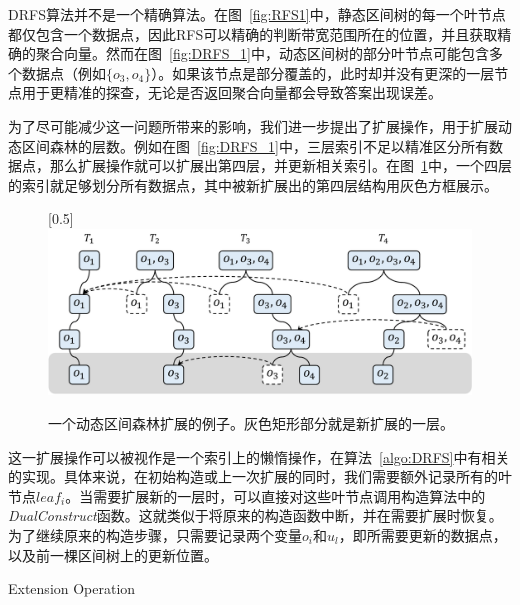 	DRFS算法并不是一个精确算法。在图~\ref{fig:RFS1}中，静态区间树的每一个叶节点都仅包含一个数据点，因此RFS可以精确的判断带宽范围所在的位置，并且获取精确的聚合向量。然而在图~\ref{fig:DRFS_1}中，动态区间树的部分叶节点可能包含多个数据点（例如$\{o_3, o_4\}$）。如果该节点是部分覆盖的，此时却并没有更深的一层节点用于更精准的探查，无论是否返回聚合向量都会导致答案出现误差。

	为了尽可能减少这一问题所带来的影响，我们进一步提出了扩展操作，用于扩展动态区间森林的层数。例如在图~\ref{fig:DRFS_1}中，三层索引不足以精准区分所有数据点，那么扩展操作就可以扩展出第四层，并更新相关索引。在图~\ref{fig:DRFS_2}中，一个四层的索引就足够划分所有数据点，其中被新扩展出的第四层结构用灰色方框展示。

\begin{figure}[h!]\centering
	\scalebox{0.5}[0.5]{\includegraphics{./figures/DRFS_2.pdf}}
	\caption{一个动态区间森林扩展的例子。灰色矩形部分就是新扩展的一层。}
	\label{fig:DRFS_2}
\end{figure}

	这一扩展操作可以被视作是一个索引上的懒惰操作，在算法~\ref{algo:DRFS}中有相关的实现。具体来说，在初始构造或上一次扩展的同时，我们需要额外记录所有的叶节点$leaf_i$。当需要扩展新的一层时，可以直接对这些叶节点调用构造算法中的\textit{DualConstruct}函数。这就类似于将原来的构造函数中断，并在需要扩展时恢复。为了继续原来的构造步骤，只需要记录两个变量$o_i$和$u_l$，即所需要更新的数据点，以及前一棵区间树上的更新位置。

	\begin{algorithm}[t]
		\caption{Extension Operation}
		\label{algo:DRFS}
		\DontPrintSemicolon
		
	
	\end{algorithm}


